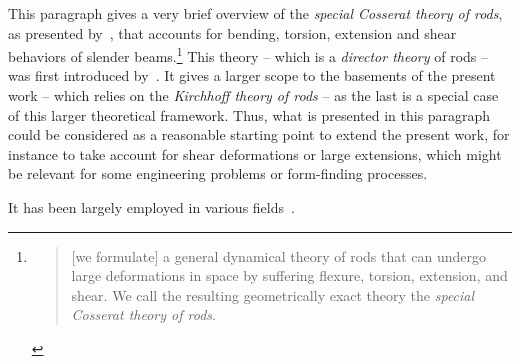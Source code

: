This paragraph gives a very brief overview of the \emph{special Cosserat theory of rods}, as presented by~, that accounts for bending, torsion, extension and shear  behaviors of slender beams.\footnote{\blockcquote[p.~270]{Antman2005}{[we formulate] a general dynamical theory of rods that can undergo large deformations in space by suffering flexure, torsion, extension, and shear. We call the resulting geometrically exact theory the \emph{special Cosserat theory of rods}.}} This theory -- which is a \emph{director theory} of rods -- was first introduced by~. It gives a larger scope to the basements of the present work -- which relies on the \emph{Kirchhoff theory of rods} -- as the last is a special case of this larger theoretical framework. Thus, what is presented in this paragraph could be considered as a reasonable starting point to extend the present work, for instance to take account for shear deformations or large extensions, which might be relevant for some engineering problems or form-finding processes.

It has been largely employed in various fields~\cite{Shi1995, Bergou2010}.


